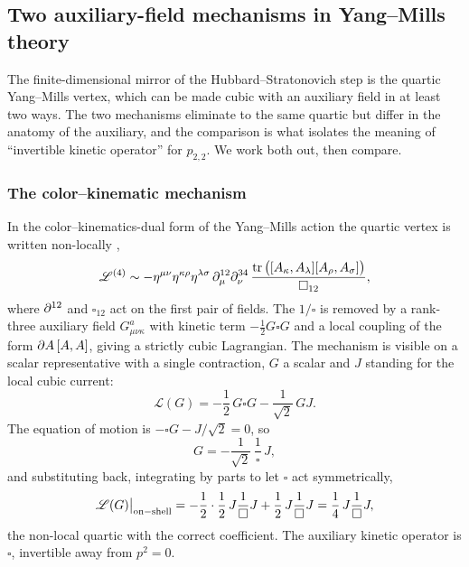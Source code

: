 \subsection{Two auxiliary-field mechanisms in Yang--Mills theory}
\label{pg:sec:ym}

The finite-dimensional mirror of the Hubbard--Stratonovich step is the quartic Yang--Mills vertex, which can be made cubic with an auxiliary field in at least two ways.
The two mechanisms eliminate to the same quartic but differ in the anatomy of the auxiliary, and the comparison is what isolates the meaning of \enquote{invertible kinetic operator} for $p_{2,2}$.
We work both out, then compare.

\subsubsection{The color--kinematic mechanism}
\label{pg:sec:ym:ck}

In the color--kinematics-dual form of the Yang--Mills action the quartic vertex is written non-locally \cite{Borsten:2021:DoubleCopyHomotopy},
\begin{equation}
  \label{pg:eq:ym:quartic-nonlocal}
  \mathscr L^{(4)}
    \sim - \eta^{\mu\nu} \eta^{\kappa\rho} \eta^{\lambda\sigma} \,
      \partial^{12}_\mu \partial^{34}_\nu \,
      \frac{\operatorname{tr}\big( [A_\kappa, A_\lambda] [A_\rho, A_\sigma] \big)}{\square_{12}},
\end{equation}
where $\partial^{12}$ and $\square_{12}$ act on the first pair of fields.
The $1/\square$ is removed by a rank-three auxiliary field $G^a_{\mu\nu\kappa}$ with kinetic term $-\frac12 G\square G$ and a local coupling of the form $\partial A\,[A,A]$, giving a strictly cubic Lagrangian.
The mechanism is visible on a scalar representative with a single contraction, $G$ a scalar and $J$ standing for the local cubic current:
\begin{equation}
  \mathscr L(G)
    = - \frac12 \, G \square G
      - \frac{1}{\sqrt 2} \, G J .
\end{equation}
The equation of motion is $-\square G-J/\sqrt2=0$, so
\begin{equation}
  G
    = - \frac{1}{\sqrt 2} \, \frac{1}{\square} \, J,
\end{equation}
and substituting back, integrating by parts to let $\square$ act symmetrically,
\begin{equation}
  \mathscr L(G) \big|_{\rm on-shell}
    = - \frac12 \cdot \frac12 \, J \frac{1}{\square} J
      + \frac12 \, J \frac{1}{\square} J
    = \frac14 \, J \frac{1}{\square} J ,
\end{equation}
the non-local quartic with the correct coefficient.
The auxiliary kinetic operator is $\square$, invertible away from $p^2=0$.

